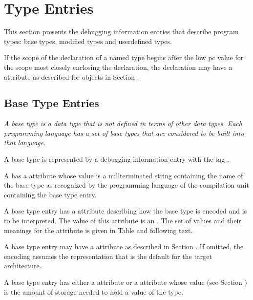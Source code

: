 \chapter{Type Entries}
\label{chap:typeentries}
This section presents the debugging information entries
that describe program types: base types, modified types and
user\dash defined types.

If the scope of the declaration of a named type begins after
\hypertarget{chap:DWATstartscopetypedeclaration}{}
the low pc value for the scope most closely enclosing the
declaration, the declaration may have a 
\DWATstartscope{}
attribute as described for objects in 
Section .

\section{Base Type Entries}
\label{chap:basetypeentries}

\textit{A base type is a data type that is not defined in terms of
other data types. 
Each programming language has a set of base
types that are considered to be built into that language.}

A base type is represented by a debugging information entry
with the tag 
\DWTAGbasetypeTARG.

A 
has a \DWATname{} attribute
whose
value is
a null\dash terminated string containing the name of the base type
as recognized by the programming language of the compilation
unit containing the base type entry.

A base type entry has 
a \DWATencoding{} attribute describing
how the base type is encoded and is to be interpreted. The
value of this attribute is an 
. The set of
values and their meanings for the
\DWATencoding{} attribute
is given in 
Table 
and following text.  

A base type entry
may have a \DWATendianity{} attribute
as described in 
Section . 
If omitted, the encoding assumes the representation that
is the default for the target architecture.

A base type entry has 
\hypertarget{chap:DWATbytesizedataobjectordatatypesize}{}
either a \DWATbytesize{} attribute
\hypertarget{chap:DWATbitsizebasetypebitsize}{}
or a \DWATbitsize{} attribute 
whose  value
(see Section ) 
is the amount of storage needed to hold
a value of the type.

